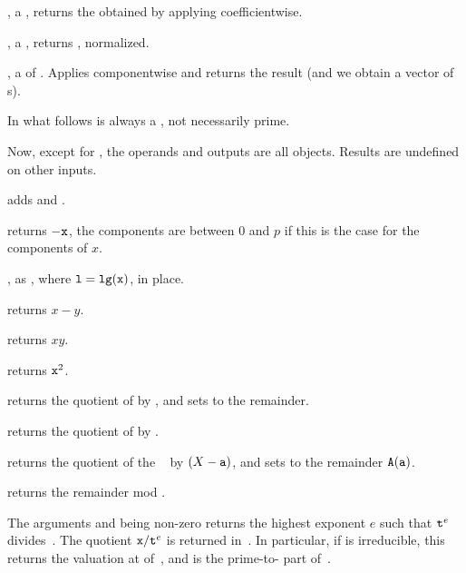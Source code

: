 ,  a , returns the
 obtained by applying  coefficientwise.

,  a , returns , normalized.

,  a  of . Applies
 componentwise and returns the result (and we obtain a vector
of s).

 In what follows  is always a ,
not necessarily prime.

\noindent Now, except for , the operands and outputs are all 
objects. Results are undefined on other inputs.

 adds  and .

 returns $-{\tt x}$, the components are
between $0$ and $p$ if this is the case for the components of $x$.

, as , where
${\tt l} = {\tt lg(x)}$, in place.

 returns $x - y$.

 returns $x y$.

 returns ${\tt x}^2$.

 returns the quotient
of  by , and sets  to the remainder.

 returns the quotient of  by
.

 returns the
quotient of the ~ by $(X - {\tt a})$, and sets  to the
remainder ${\tt A}({\tt a})$.

 returns the remainder  mod
.

 The arguments  and
 being non-zero  returns the highest exponent $e$ such that
${\tt t}^{e}$ divides~. The quotient ${\tt x}/{\tt t}^{e}$ is returned
in~. In particular, if  is irreducible, this returns the
valuation at  of~, and  is the prime-to- part
of~.

